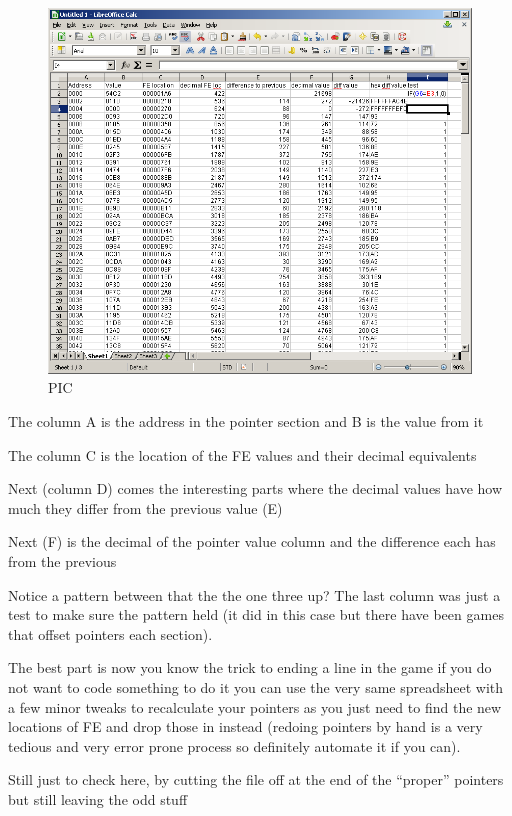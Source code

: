 \documentclass[
]{book}
\begin{document}
\begin{figure}
\centering
\includegraphics{images/104_home_fast6191_romhackingguide_unrenamed_fil____romhackingguidepointersexamplespreadsheet1.png}
\caption{PIC}
\end{figure}

The column A is the address in the pointer section and B is the value from it

The column C is the location of the FE values and their decimal equivalents

Next (column D) comes the interesting parts where the decimal values have how much they differ from the previous value (E)

Next (F) is the decimal of the pointer value column and the difference each has from the previous

Notice a pattern between that the the one three up? The last column was just a test to make sure the pattern held (it did in this case but there have been games that offset pointers each section).

The best part is now you know the trick to ending a line in the game if you do not want to code something to do it you can use the very same spreadsheet with a few minor tweaks to recalculate your pointers as you just need to find the new locations of FE and drop those in instead (redoing pointers by hand is a very tedious and very error prone process so definitely automate it if you can).

Still just to check here, by cutting the file off at the end of the ``proper'' pointers but still leaving the odd stuff
\end{document}
